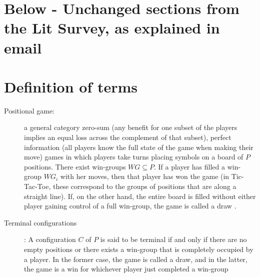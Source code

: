 \documentclass[english, 11pt]{article}
\begin{document}
\pagebreak
\section*{Below - Unchanged sections from the Lit Survey, as explained in email}


\section{Definition of terms}

\begin{description}
	\item [Positional game:] a general category zero-sum (any benefit for one subset of the players implies an equal loss across the complement of that subset), perfect information (all players know the full state of the game when making their move) games in which players take turns placing symbols on a board of $P$ positions. There exist win-groups $WG \subseteq P$. If a player has filled a win-group $WG_i$ with her moves, then that player has won the game (in Tic-Tac-Toe, these correspond to the groups of positions that are along a straight line). If, on the other hand, the entire board is filled without either player gaining control of a full win-group, the game is called a draw \cite{krivelevick}.
	\item [Terminal configurations]: A configuration $C$ of $P$ is said to be terminal if and only if there are no empty positions or there exists a win-group that is completely occupied by a player. In the former case, the game is called a draw, and in the latter, the game is a win for whichever player just completed a win-group \cite{krivelevick}
	

\end{description}
\end{document}
